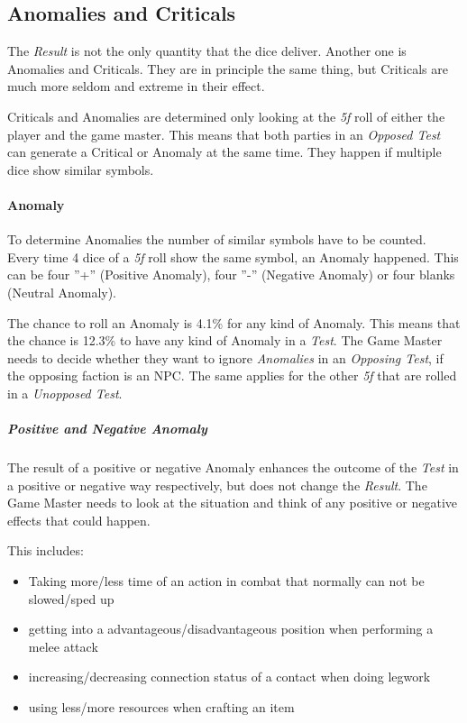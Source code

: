 \subsection{Anomalies and Criticals}

The \emph{Result} is not the only quantity that the dice deliver. Another one is
Anomalies and Criticals. They are in principle the same thing, but Criticals are
much more seldom and extreme in their effect.

Criticals and Anomalies are determined only looking at the \emph{5f} roll of either
the player and the game master. This means that both parties in an \emph{Opposed Test}
can generate a Critical or Anomaly at the same time. They happen if multiple dice
show similar symbols.

\paragraph{Anomaly}
To determine Anomalies the number of similar symbols have to be counted. Every time
4 dice of a \emph{5f} roll show the same symbol, an Anomaly happened.
This can be four ''+'' (Positive Anomaly), four ''-'' (Negative Anomaly) or four
blanks (Neutral Anomaly).

The chance to roll an Anomaly is 4.1\% for any kind of Anomaly. This means that the
chance is 12.3\% to have any kind of Anomaly in a \emph{Test}. The Game Master
needs to decide whether they want to ignore \emph{Anomalies} in an
\emph{Opposing Test}, if the opposing faction is an NPC. The same applies for the other \emph{5f} that are
rolled in a \emph{Unopposed Test}.

\subparagraph{Positive and Negative Anomaly}
The result of a positive or negative Anomaly enhances the outcome of the
\emph{Test} in a positive or negative way respectively, but does not change the
\emph{Result}. The Game Master needs to look at the situation and think of any
positive or negative effects that could happen.

This includes:
\begin{itemize}[parsep=0em]
    \item Taking more/less time of an action in combat that normally can not
          be slowed/sped up
    \item getting into a advantageous/disadvantageous position when performing a
          melee attack
    \item increasing/decreasing connection status of a contact when doing legwork
    \item using less/more resources when crafting an item
\end{itemize}

